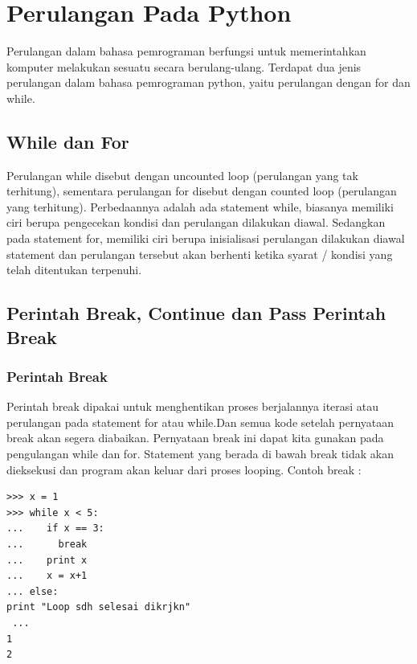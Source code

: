 

\section{Perulangan Pada Python}
Perulangan dalam bahasa pemrograman berfungsi untuk memerintahkan komputer melakukan sesuatu secara berulang-ulang. Terdapat dua jenis perulangan dalam bahasa pemrograman python, yaitu perulangan dengan for dan while.
\subsection{While dan For}
Perulangan while disebut dengan uncounted loop (perulangan yang tak terhitung), sementara perulangan for disebut dengan counted loop (perulangan yang terhitung). Perbedaannya adalah ada statement while, biasanya memiliki ciri berupa pengecekan kondisi dan perulangan dilakukan diawal. Sedangkan pada statement for, memiliki ciri berupa inisialisasi perulangan dilakukan diawal statement dan perulangan tersebut akan berhenti ketika syarat / kondisi yang telah ditentukan terpenuhi\cite{santoso2009bahasa}.

\subsection{Perintah Break, Continue dan Pass Perintah Break}
\subsubsection{Perintah Break}
Perintah break dipakai untuk menghentikan proses berjalannya iterasi atau perulangan pada statement for atau while\cite{arfian2012rekayasa}.Dan semua kode setelah pernyataan break akan segera diabaikan. Pernyataan break ini dapat kita gunakan pada pengulangan while dan for.
Statement yang berada di bawah break tidak akan dieksekusi dan program akan keluar dari proses looping.  
Contoh break : 
\begin{verbatim}
>>> x = 1     
>>> while x < 5:     
...    if x == 3:     
...      break     
...    print x     
...    x = x+1                                                                                                                    
... else:          
print "Loop sdh selesai dikrjkn"   
 ...     
1    
2 
\end{verbatim}

